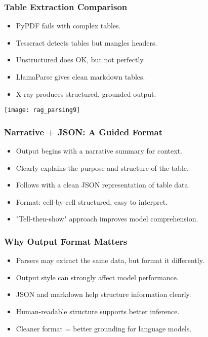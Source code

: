 \begin{frame}[fragile]\frametitle{Table Extraction Comparison}

    \begin{itemize}
      \item PyPDF fails with complex tables.
      \item Tesseract detects tables but mangles headers.
      \item Unstructured does OK, but not perfectly.
      \item LlamaParse gives clean markdown tables.
      \item X-ray produces structured, grounded output.
    \end{itemize}

    \begin{center}
      \texttt{[image: rag\_parsing9]}
    \end{center}

\end{frame}

\begin{frame}[fragile]\frametitle{Narrative + JSON: A Guided Format}
  \begin{itemize}
    \item Output begins with a narrative summary for context.
    \item Clearly explains the purpose and structure of the table.
    \item Follows with a clean JSON representation of table data.
    \item Format: cell-by-cell structured, easy to interpret.
    \item "Tell-then-show" approach improves model comprehension.
  \end{itemize}
\end{frame}

\begin{frame}[fragile]\frametitle{Why Output Format Matters}
  \begin{itemize}
    \item Parsers may extract the same data, but format it differently.
    \item Output style can strongly affect model performance.
    \item JSON and markdown help structure information clearly.
    \item Human-readable structure supports better inference.
    \item Cleaner format = better grounding for language models.
  \end{itemize}
  

\end{frame}

